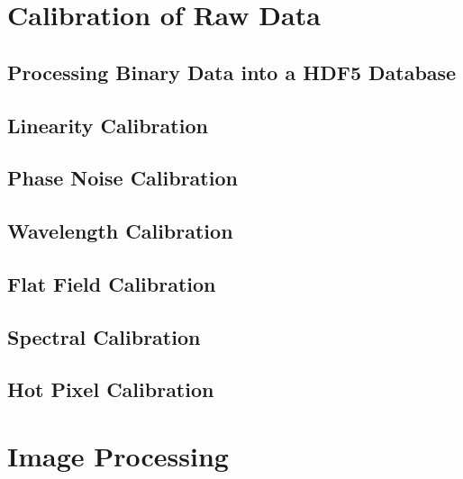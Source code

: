 \documentclass[../main.tex]{subfiles}
\begin{document}
\section{Calibration of Raw Data}
\subsection{Processing Binary Data into a HDF5 Database}
\subsection{Linearity Calibration}
\subsection{Phase Noise Calibration}
\subsection{Wavelength Calibration}
\subsection{Flat Field Calibration}
\subsection{Spectral Calibration}
\subsection{Hot Pixel Calibration}

\section{Image Processing}
\end{document}
